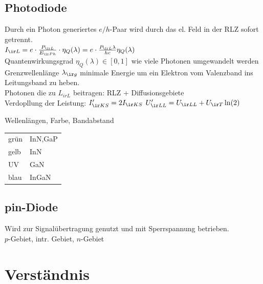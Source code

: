 \documentclass[fs, footer]{latex4ei}
\begin{document}
\begin{multicols*}{4}
{\subsection{Photodiode}
Durch ein Photon generiertes $e/h$-Paar wird durch das el. Feld in der RLZ sofort getrennt.\\
$I_{\ir L} = e \cdot \frac{P_{\ir L}}{E_{\ir Ph}} \cdot \eta_Q(\lambda) = e \cdot \frac{P_{\ir L} \lambda}{h c} \eta_Q(\lambda)$\\
Quantenwirkungsgrad $\eta_Q(\lambda) \in [0,1]$ wie viele Photonen umgewandelt werden\\
Grenzwellenlänge $\lambda_{\ir g}$ minimale Energie um ein Elektron vom Valenzband ins Leitungsband zu heben.\\
Photonen die zu $L_{ir L}$ beitragen: RLZ + Diffusionsgebiete\\
Verdopllung der Leistung: $I_{\ir KS}' = 2 I_{\ir KS}$ \quad $U_{\ir LL}' = U_{\ir LL} + U_{\ir T} \ln(2)$

Wellenlängen, Farbe, Bandabstand\\
\begin{tabular}{ll}
grün & InN,GaP\\
gelb & InN\\
UV & GaN\\
blau & InGaN\\
\end{tabular}

}



\subsection{pin-Diode}
Wird zur Signalübertragung genutzt und mit Sperrspannung betrieben.\\
$p$-Gebiet, intr. Gebiet, $n$-Gebiet\\ 







\section{Verständnis}
\sectionbox{
	
}
\end{multicols*}
\end{document}
